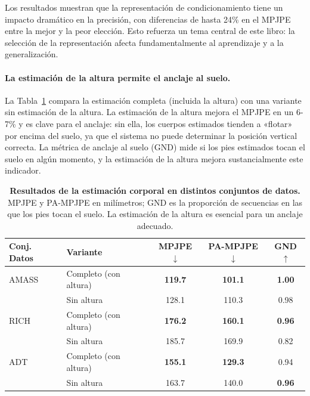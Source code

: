 \documentclass[../../book-main_es.tex]{subfiles}
\begin{document}
Los resultados muestran que la representación de condicionamiento tiene un impacto
dramático en la precisión, con diferencias de hasta 24\% en el MPJPE entre la
mejor y la peor elección. Esto refuerza un tema central de este libro:
la selección de la representación afecta fundamentalmente al aprendizaje y a la generalización.

\paragraph{La estimación de la altura permite el anclaje al suelo.}
La Tabla~\ref{tab:egoallo_body_results} compara la estimación completa
(incluida la altura) con una variante sin estimación de la altura.
La estimación de la altura mejora el MPJPE en un 6-7\% y es clave para
el anclaje: sin ella, los cuerpos estimados tienden a «flotar» por encima del
suelo, ya que el sistema no puede determinar la posición vertical
correcta. La métrica de anclaje al suelo (GND) mide si los pies estimados
tocan el suelo en algún momento, y la estimación de la altura mejora sustancialmente este indicador.

\begin{table}[htbp]
    \centering
    \caption{\textbf{Resultados de la estimación corporal en distintos conjuntos de datos.} MPJPE
        y PA-MPJPE en milímetros; GND es la proporción de secuencias
        en las que los pies tocan el suelo. La estimación de la altura es 
    esencial para un anclaje adecuado.}
    \label{tab:egoallo_body_results}
    \small
    \begin{tabular}{llccc}
        \toprule
        \textbf{Conj. Datos} & \textbf{Variante} &
        \textbf{MPJPE}$\downarrow$ & \textbf{PA-MPJPE}$\downarrow$ &
        \textbf{GND}$\uparrow$ \\
        \midrule
        AMASS & Completo (con altura) & \textbf{119.7} & \textbf{101.1}
        & \textbf{1.00} \\
        & Sin altura & 128.1 & 110.3 & 0.98 \\
        \midrule
        RICH  & Completo (con altura) & \textbf{176.2} & \textbf{160.1}
        & \textbf{0.96} \\
        & Sin altura & 185.7 & 169.9 & 0.82 \\
        \midrule
        ADT   & Completo (con altura) & \textbf{155.1} & \textbf{129.3} & 0.94 \\
        & Sin altura & 163.7 & 140.0 & \textbf{0.96} \\
        \bottomrule
    \end{tabular}
\end{table}
\end{document}
